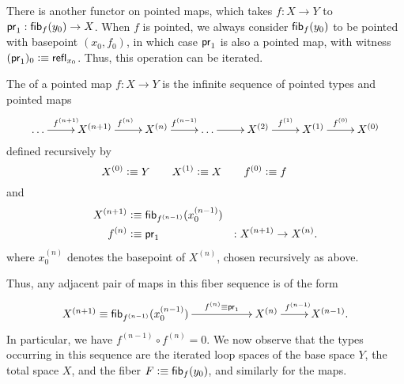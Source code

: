 There is another functor on pointed maps, which takes $f:X\to Y$ to $\mathsf{pr}_{1} : {\mathsf{fib}}_{f}(y_0) \to X$.
When $f$ is pointed, we always consider ${\mathsf{fib}}_{f}(y_0)$ to be pointed with basepoint $(x_0,f_0)$, in which case $\mathsf{pr}_{1}$ is also a pointed map, with witness $(\mathsf{pr}_{1})_0 \vcentcolon\equiv \mathsf{refl}_{x_0}$.
Thus, this operation can be iterated.

\begin{defn}
  The 
  of a pointed map $f:X\to Y$ is the infinite sequence of pointed types and pointed maps
  \[\xymatrix{\dots \ar[r]^{f^{(n+1)}} & X^{(n+1)} \ar[r]^{f^{(n)}} & X^{(n)} \ar^-{f^{(n-1)}}[r] & \dots \ar[r] & X^{(2)} \ar^-{f^{(1)}}[r] & X^{(1)} \ar[r]^{f^{(0)}} & X^{(0)}}\]
  defined recursively by
  \[ X^{(0)} \vcentcolon\equiv Y\qquad
    X^{(1)} \vcentcolon\equiv X\qquad
    f^{(0)} \vcentcolon\equiv f\qquad
    \]    
  and
  \begin{alignat*}{2}
    X^{(n+1)} &\vcentcolon\equiv {\mathsf{fib}}_{f^{(n-1)}}(x^{(n-1)}_0)\\
    f^{(n)} &\vcentcolon\equiv \mathsf{pr}_{1} &: X^{(n+1)} \to X^{(n)}.
  \end{alignat*}
  where $x^{(n)}_0$ denotes the basepoint of $X^{(n)}$, chosen recursively as above.
\end{defn}

Thus, any adjacent pair of maps in this fiber sequence is of the form
\[ \xymatrix{ X^{(n+1)} \jdeq \hfib{f^{(n-1)}}{x^{(n-1)}_0} \ar[rr]^-{f^{(n)}\jdeq \proj1} && X^{(n)} \ar[r]^{f^{(n-1)}} & X^{(n-1)}. } \]
In particular, we have $f^{(n-1)} \circ f^{(n)} = 0$.
We now observe that the types occurring in this sequence are the iterated loop spaces of the base
space $Y$, the total space $X$, and the fiber $F\vcentcolon\equiv {\mathsf{fib}}_{f}(y_0)$, and similarly for the maps.

